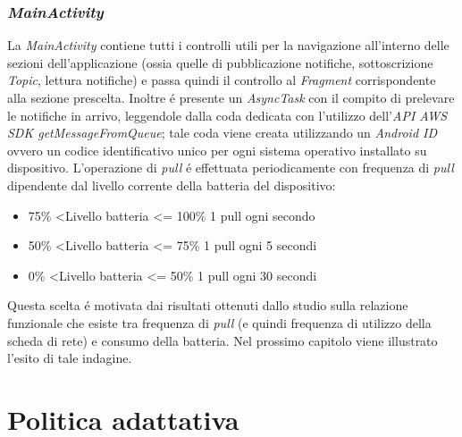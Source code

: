 \documentclass{article}
\begin{document}
\subsubsection{\textit{MainActivity}}
La \textit{MainActivity} contiene tutti i controlli utili per la navigazione all'interno delle sezioni dell'applicazione (ossia quelle di pubblicazione notifiche, sottoscrizione \textit{Topic}, lettura notifiche) e passa quindi il controllo al \textit{Fragment} corrispondente alla sezione prescelta. Inoltre \'e presente un \textit{AsyncTask} con il compito di prelevare le notifiche in arrivo, leggendole dalla coda dedicata con l'utilizzo dell'\textit{API AWS SDK getMessageFromQueue}; tale coda viene creata utilizzando un \textit{Android ID} ovvero un codice identificativo unico per ogni sistema operativo installato su dispositivo. L'operazione di \textit{pull} \'e effettuata periodicamente con frequenza di \textit{pull} dipendente dal livello corrente della batteria del dispositivo:
\begin{itemize}
\item   75\% \textless  Livello batteria \textless= 100\%  1 pull ogni secondo
\item	50\% \textless  Livello batteria \textless= 75\%   1 pull ogni 5 secondi
\item	0\% \textless  Livello batteria \textless= 50\%   1 pull ogni 30 secondi
\end{itemize}
 
Questa scelta \'e motivata dai risultati ottenuti dallo studio sulla relazione funzionale che esiste tra frequenza di \textit{pull} (e quindi frequenza di utilizzo della scheda di rete) e consumo della batteria. Nel prossimo capitolo viene illustrato l'esito di tale indagine.

\section{Politica adattativa}
\end{document}
